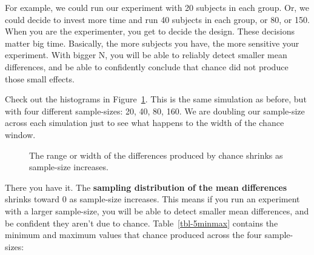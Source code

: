 \documentclass[
  letterpaper,
  DIV=11,
  numbers=noendperiod]{scrreprt}
\begin{document}
For example, we could run our experiment with 20 subjects in each group.
Or, we could decide to invest more time and run 40 subjects in each
group, or 80, or 150. When you are the experimenter, you get to decide
the design. These decisions matter big time. Basically, the more
subjects you have, the more sensitive your experiment. With bigger N,
you will be able to reliably detect smaller mean differences, and be
able to confidently conclude that chance did not produce those small
effects.

Check out the histograms in Figure~\ref{fig-5sampleDistNormal}. This is
the same simulation as before, but with four different sample-sizes: 20,
40, 80, 160. We are doubling our sample-size across each simulation just
to see what happens to the width of the chance window.

\begin{figure}


\caption{\label{fig-5sampleDistNormal}The range or width of the
differences produced by chance shrinks as sample-size increases.}

\end{figure}%

There you have it. The \textbf{sampling distribution of the mean
differences} shrinks toward 0 as sample-size increases. This means if
you run an experiment with a larger sample-size, you will be able to
detect smaller mean differences, and be confident they aren't due to
chance. Table~\ref{tbl-5minmax} contains the minimum and maximum values
that chance produced across the four sample-sizes:
\end{document}
